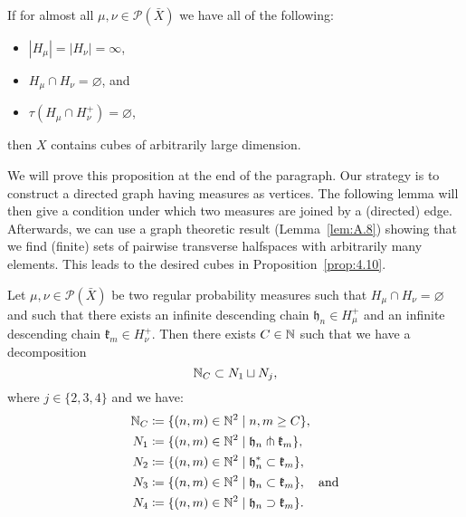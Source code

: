 \begin{prop}[{\cite[Proposition~4.10]{MR3509968}}]
  \label{prop:4.10}
  If for almost all \(\mu, \nu \in \mathcal{P}(\bar X)\) we have all of the following:
  \begin{itemize}
  \item \(|H_\mu| = |H_\nu| = \infty\),
  \item \(H_\mu \cap H_\nu = \varnothing\), and
  \item \(\tau(H_\mu \cap H_\nu^+) = \varnothing\),
  \end{itemize}
  then \(X\) contains cubes of arbitrarily large dimension.
\end{prop}

We will prove this proposition at the end of the paragraph. Our strategy is to construct a directed graph having measures as vertices. The following lemma will then give a condition under which two measures are joined by a (directed) edge. Afterwards, we can use a graph theoretic result (Lemma~\ref{lem:A.8}) showing that we find (finite) sets of pairwise transverse halfspaces with arbitrarily many elements. This leads to the desired cubes in Proposition~\ref{prop:4.10}.


\begin{lemma}
  \label{lem:sep-n}
  Let \(\mu, \nu \in \mathcal{P}(\bar X)\) be two regular probability measures such that \(H_\mu \cap H_\nu = \varnothing\) and such that there exists an infinite descending chain \(\mathfrak{h}_n\in H_\mu^+\) and an infinite descending chain \(\mathfrak{k}_m \in H_\nu^+\). Then there exists \(C \in \mathbb{N}\) such that we have a decomposition
  \[
    \mathbb{N}_C \subset N_1 \sqcup N_j,
  \]
  where \(j \in \{2,3,4\}\) and  we have:
  \begin{align*}
    \mathbb{N}_C & \coloneqq \{(n,m) \in \mathbb{N}^2 \mid n,m \geq C\},\\
    N_1 & \coloneqq \{(n,m) \in \mathbb{N}^2 \mid \mathfrak{h}_n \pitchfork \mathfrak{k}_m\},\\
    N_2 & \coloneqq \{(n,m) \in \mathbb{N}^2 \mid \mathfrak{h}_n^\ast \subset \mathfrak{k}_m\},\\
    N_3 & \coloneqq \{(n,m) \in \mathbb{N}^2 \mid \mathfrak{h}_n \subset \mathfrak{k}_m\},\quad \text{and}\\
    N_4 & \coloneqq \{(n,m) \in \mathbb{N}^2 \mid \mathfrak{h}_n \supset \mathfrak{k}_m\}.
  \end{align*}
\end{lemma}

